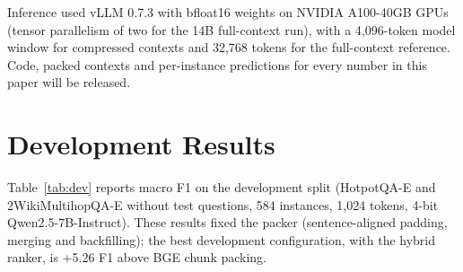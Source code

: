 \documentclass[11pt]{article}
\begin{document}
\begin{table}[h]
\centering
\small
{}
\caption{Implementation constants (all frozen before testing).}
\label{tab:impl}
\end{table}

Inference used vLLM 0.7.3 with bfloat16 weights on NVIDIA A100-40GB GPUs (tensor parallelism of two for the 14B full-context run), with a 4,096-token model window for compressed contexts and 32,768 tokens for the full-context reference. Code, packed contexts and per-instance predictions for every number in this paper will be released.

\section{Development Results}
\label{app:dev}
Table~\ref{tab:dev} reports macro F1 on the development split (HotpotQA-E and 2WikiMultihopQA-E without test questions, 584 instances, 1,024 tokens, 4-bit Qwen2.5-7B-Instruct). These results fixed the packer (sentence-aligned padding, merging and backfilling); the best development configuration, with the hybrid ranker, is +5.26 F1 above BGE chunk packing.

\begin{table}[h]
\centering
\small
{}
\caption{Development macro F1 (1,024 tokens).}
\label{tab:dev}
\end{table}
\end{document}
